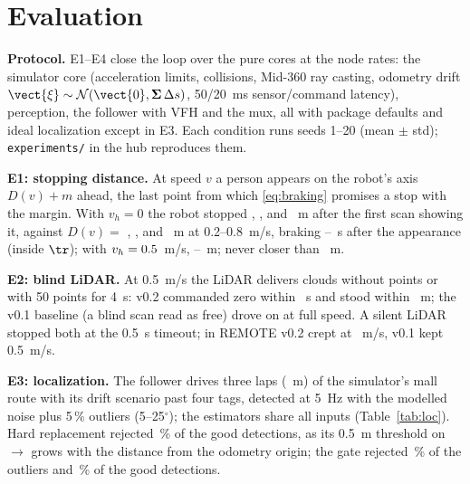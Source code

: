 \section{Evaluation}
\label{sec:eval}



\textbf{Protocol.} E1--E4 close the loop over the pure cores at the node rates: the simulator
core (acceleration limits, collisions, Mid-360 ray casting, odometry drift
$\vect{\xi} \sim \mathcal{N}(\vect{0}, \boldsymbol{\Sigma}\,\Delta s)$, 50/20~ms sensor/command
latency), perception, the follower with VFH and the mux, all with package defaults and ideal
localization except in E3. Each condition runs seeds 1--20 (mean $\pm$ std);
\texttt{experiments/} in the hub reproduces them.

\textbf{E1: stopping distance.} At speed $v$ a person appears on the robot's axis $D(v) + m$
ahead, the last point from which \eqref{eq:braking} promises a stop with the margin. With
$v_h = 0$ the robot stopped \EOneZeroMeasuredA, \EOneZeroMeasuredB, \EOneZeroMeasuredC{} and
\EOneZeroMeasuredD~m after the first scan showing it, against
$D(v) =$ \EOneZeroModelA, \EOneZeroModelB, \EOneZeroModelC{} and \EOneZeroModelD~m at
0.2--0.8~m/s, braking \EOneZeroReactMin--\EOneZeroReactMax~s after the appearance (inside
$\tr$); with $v_h = 0.5$~m/s, \EOneMeasuredA--\EOneMeasuredD~m; never closer than
\EOneZeroClearMin~m.

\textbf{E2: blind LiDAR.} At 0.5~m/s the LiDAR delivers clouds without points or with 50
points for 4~s: v0.2 commanded zero within \ETwoBlindZeroMax~s and stood within
\ETwoBlindDistanceMax~m; the v0.1 baseline (a blind scan read as free) drove on at full speed.
A silent LiDAR stopped both at the 0.5~s timeout; in REMOTE v0.2 crept at \ETwoCreepMax~m/s,
v0.1 kept 0.5~m/s.

\textbf{E3: localization.} The follower drives three laps (\EThreeDistance~m) of the
simulator's mall route with its drift scenario past four tags, detected at 5~Hz with the
modelled noise plus 5\,\% outliers (5--25$^\circ$); the estimators share all inputs
(Table~\ref{tab:loc}). Hard
replacement rejected \EThreeHardReplaceInliersRejected\,\% of the good detections, as its
0.5~m threshold on $\to$ grows with the distance from the odometry origin;
the gate rejected \EThreeEkfTagsOutliersRejected\,\% of the outliers and
\EThreeEkfTagsInliersRejected\,\% of the good detections.

\begin{table}[t]
  \centering
  \caption{E3: position RMSE (ATE), largest position error, heading RMSE}
  \label{tab:loc}
  \footnotesize
  
\end{table}

